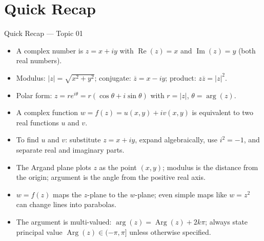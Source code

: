 \documentclass[12pt,a4paper]{article}
\begin{document}
\section{Quick Recap}

\begin{learnbox}{Quick Recap --- Topic 01}
\begin{itemize}[noitemsep]
  \item A complex number is \(z = x+iy\) with
        \(\operatorname{Re}(z)=x\) and \(\operatorname{Im}(z)=y\)
        (both real numbers).
  \item Modulus: \(|z| = \sqrt{x^2+y^2}\); conjugate:
        \(\overline{z} = x-iy\); product:
        \(z\overline{z} = |z|^2\).
  \item Polar form: \(z = re^{i\theta} = r(\cos\theta+i\sin\theta)\)
        with \(r=|z|\), \(\theta=\arg(z)\).
  \item A complex function \(w=f(z)=u(x,y)+iv(x,y)\) is equivalent to
        two real functions \(u\) and \(v\).
  \item To find \(u\) and \(v\): substitute \(z=x+iy\), expand
        algebraically, use \(i^2=-1\), and separate real and imaginary
        parts.
  \item The Argand plane plots \(z\) as the point \((x,y)\); modulus is
        the distance from the origin; argument is the angle from the
        positive real axis.
  \item \(w=f(z)\) maps the \(z\)-plane to the \(w\)-plane;
        even simple maps like \(w=z^2\) can change lines into parabolas.
  \item The argument is multi-valued: \(\arg(z)=\operatorname{Arg}(z)+2k\pi\);
        always state principal value \(\operatorname{Arg}(z)\in(-\pi,\pi]\)
        unless otherwise specified.
\end{itemize}
\end{learnbox}
\end{document}
